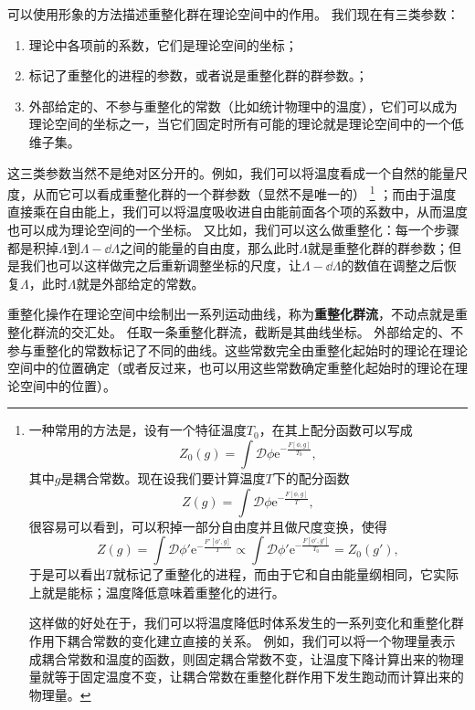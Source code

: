 \documentclass[hyperref, UTF8, a4paper]{ctexart}
\newcommand*{\ee}{\mathrm{e}}
\newcommand*{\fd}[1]{\mathcal{D}{#1}}
\begin{document}
可以使用形象的方法描述重整化群在理论空间中的作用。
我们现在有三类参数：
\begin{enumerate}
    \item 理论中各项前的系数，它们是理论空间的坐标；
    \item 标记了重整化的进程的参数，或者说是重整化群的群参数。；
    \item 外部给定的、不参与重整化的常数（比如统计物理中的温度），它们可以成为理论空间的坐标之一，当它们固定时所有可能的理论就是理论空间中的一个低维子集。
\end{enumerate}
这三类参数当然不是绝对区分开的。例如，我们可以将温度看成一个自然的能量尺度，从而它可以看成重整化群的一个群参数（显然不是唯一的）%
\footnote{
    一种常用的方法是，设有一个特征温度$T_0$，在其上配分函数可以写成
    \[
        Z_0(g) = \int \fd{\phi} \ee^{- \frac{F[\phi, g]}{T_0}},
    \]
    其中$g$是耦合常数。现在设我们要计算温度$T$下的配分函数
    \[
        Z(g) = \int \fd{\phi} \ee^{- \frac{F[\phi, g]}{T}},
    \]
    很容易可以看到，可以积掉一部分自由度并且做尺度变换，使得
    \[
        Z(g) = \int \fd{\phi'} \ee^{- \frac{F'[\phi', g]}{T}} \propto \int \fd{\phi'} \ee^{- \frac{F[\phi', g']}{T_0}} = Z_0(g'),
    \]
    于是可以看出$T$就标记了重整化的进程，而由于它和自由能量纲相同，它实际上就是能标；温度降低意味着重整化的进行。

    这样做的好处在于，我们可以将温度降低时体系发生的一系列变化和重整化群作用下耦合常数的变化建立直接的关系。
    例如，我们可以将一个物理量表示成耦合常数和温度的函数，则固定耦合常数不变，让温度下降计算出来的物理量就等于固定温度不变，让耦合常数在重整化群作用下发生跑动而计算出来的物理量。
}
；而由于温度直接乘在自由能上，我们可以将温度吸收进自由能前面各个项的系数中，从而温度也可以成为理论空间的一个坐标。
又比如，我们可以这么做重整化：每一个步骤都是积掉$\Lambda$到$\Lambda-\dd{\Lambda}$之间的能量的自由度，那么此时$\Lambda$就是重整化群的群参数；但是我们也可以这样做完之后重新调整坐标的尺度，让$\Lambda-\dd{\Lambda}$的数值在调整之后恢复$\Lambda$，此时$\Lambda$就是外部给定的常数。

重整化操作在理论空间中绘制出一系列运动曲线，称为\textbf{重整化群流}，不动点就是重整化群流的交汇处。
任取一条重整化群流，截断是其曲线坐标。
外部给定的、不参与重整化的常数标记了不同的曲线。这些常数完全由重整化起始时的理论在理论空间中的位置确定（或者反过来，也可以用这些常数确定重整化起始时的理论在理论空间中的位置）。
\end{document}
